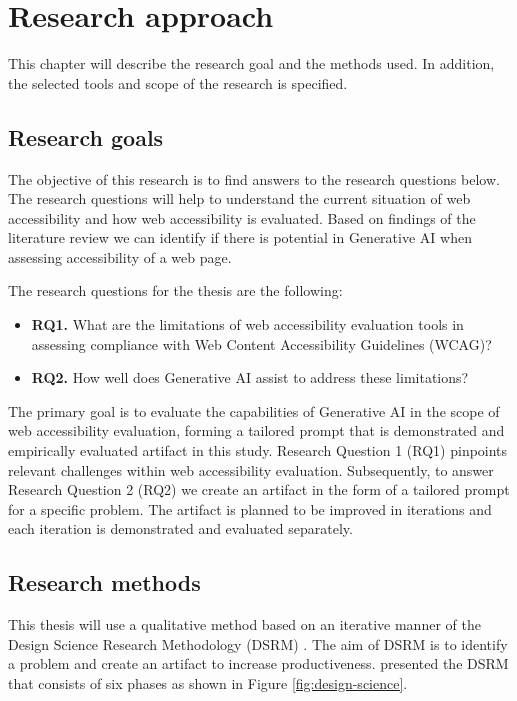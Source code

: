 \chapter{Research approach\label{methods}}

This chapter will describe the research goal and the methods used. In addition, the selected tools and scope of the research is specified.

\section{Research goals}

The objective of this research is to find answers to the research questions below. The research questions will help to understand the current situation of web accessibility and how web accessibility is evaluated. Based on findings of the literature review we can identify if there is potential in Generative AI when assessing accessibility of a web page. 

The research questions for the thesis are the following:

\begin{itemize}
    \item \textbf{RQ1.} What are the limitations of web accessibility evaluation tools in assessing compliance with Web Content Accessibility Guidelines (WCAG)?
    \item \textbf{RQ2.} How well does Generative AI assist to address these limitations?
\end{itemize}

The primary goal is to evaluate the capabilities of Generative AI in the scope of web accessibility evaluation, forming a tailored prompt that is demonstrated and empirically evaluated artifact in this study. Research Question 1 (RQ1) pinpoints relevant challenges within web accessibility evaluation. Subsequently, to answer Research Question 2 (RQ2) we create an artifact in the form of a tailored prompt for a specific problem. The artifact is planned to be improved in iterations and each iteration is demonstrated and evaluated separately.

\section{Research methods}

This thesis will use a qualitative method based on an iterative manner of the Design Science Research Methodology (DSRM) \citep{designsciencemethodology, iterativedesignscience}. The aim of DSRM is to identify a problem and create an artifact to increase productiveness. \textcite{iterativedesignscience} presented the DSRM that consists of six phases as shown in Figure \ref{fig:design-science}.

